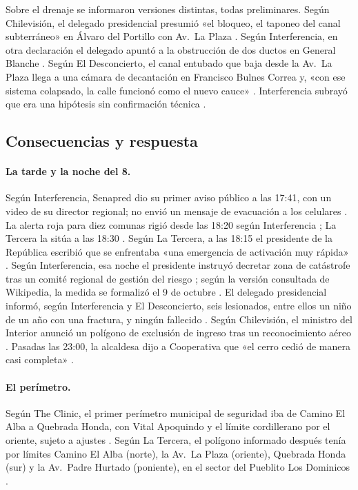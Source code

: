 Sobre el drenaje se informaron versiones distintas, todas preliminares. Según Chilevisión, el delegado presidencial presumió «el bloqueo, el taponeo del canal subterráneo» en Álvaro del Portillo con Av.\ La Plaza \citep{chilevision2026}. Según Interferencia, en otra declaración el delegado apuntó a la obstrucción de dos ductos en General Blanche \citep{interferencia2026}. Según El Desconcierto, el canal entubado que baja desde la Av.\ La Plaza llega a una cámara de decantación en Francisco Bulnes Correa y, «con ese sistema colapsado, la calle funcionó como el nuevo cauce» \citep{eldesconcierto2026}. Interferencia subrayó que era una hipótesis sin confirmación técnica \citep{interferencia2026}.

\subsection*{Consecuencias y respuesta}
\paragraph{La tarde y la noche del 8.} Según Interferencia, Senapred dio su primer aviso público a las 17:41, con un video de su director regional; no envió un mensaje de evacuación a los celulares \citep{interferencia2026}. La alerta roja para diez comunas rigió desde las 18:20 según Interferencia \citep{interferencia2026}; La Tercera la sitúa a las 18:30 \citep{latercera2026lluvias}. Según La Tercera, a las 18:15 el presidente de la República escribió que se enfrentaba «una emergencia de activación muy rápida» \citep{latercera2026lluvias}. Según Interferencia, esa noche el presidente instruyó decretar zona de catástrofe tras un comité regional de gestión del riesgo \citep{interferencia2026}; según la versión consultada de Wikipedia, la medida se formalizó el 9 de octubre \citep{wikipedia2026}. El delegado presidencial informó, según Interferencia y El Desconcierto, seis lesionados, entre ellos un niño de un año con una fractura, y ningún fallecido \citep{interferencia2026,eldesconcierto2026}. Según Chilevisión, el ministro del Interior anunció un polígono de exclusión de ingreso tras un reconocimiento aéreo \citep{chilevision2026mapa}. Pasadas las 23:00, la alcaldesa dijo a Cooperativa que «el cerro cedió de manera casi completa» \citep{cooperativa2026alcaldesa}.

\paragraph{El perímetro.} Según The Clinic, el primer perímetro municipal de seguridad iba de Camino El Alba a Quebrada Honda, con Vital Apoquindo y el límite cordillerano por el oriente, sujeto a ajustes \citep{theclinic2026frontal}. Según La Tercera, el polígono informado después tenía por límites Camino El Alba (norte), la Av.\ La Plaza (oriente), Quebrada Honda (sur) y la Av.\ Padre Hurtado (poniente), en el sector del Pueblito Los Dominicos \citep{latercera2026}.

